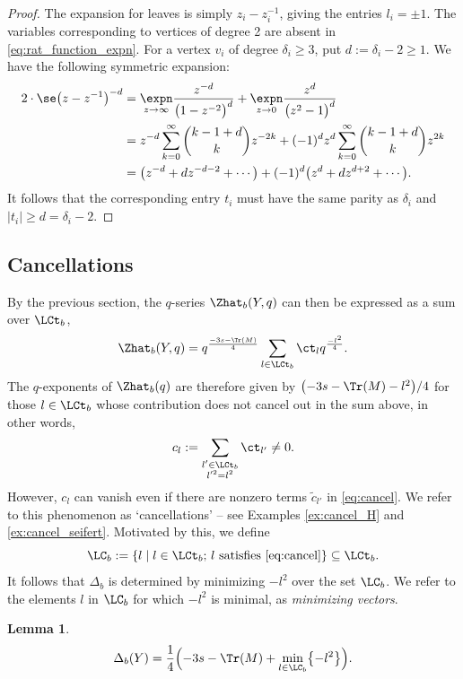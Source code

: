 \documentclass[pdftex]{sigma}
\newtheorem{Lemma}[Theorem]{Lemma}
\begin{document}
\begin{proof}
 The expansion for leaves is simply $z_i-z_i^{-1}$, giving the entries $l_i = \pm 1$. The variables corresponding to vertices of degree 2 are absent in \eqref{eq:rat_function_expn}. For a vertex $v_i$ of degree $\delta_{i} \geq 3$, put $d := \delta_{i}-2 \geq 1$. We have the following symmetric expansion:
 \begin{align*}
 2 \cdot \se \bigl(z-z^{-1}\bigr)^{-d} &{}=
 \underset{z \to \infty}{\expn} \frac{z^{-d}}{\bigl(1-z^{-2}\bigr)^{d}}
 + \underset{z \to 0}{\expn} \frac{z^{d}}{\bigl(z^2-1\bigr)^{d}}\\
 &{}=
 z^{-d} \sum_{k=0}^\infty \binom{k-1+d}{k}z^{-2k} + (-1)^d z^{d} \sum_{k=0}^\infty \binom{k-1+d}{k} z^{2k}\\
 &{}=
 \bigl(z^{-d} + d z^{-d-2} + \cdots\bigr) + (-1)^{d} \bigl(z^{d} + d z^{d+2} +\cdots\bigr).
 \end{align*}
 It follows that the corresponding entry $t_i$ must have the same parity as $\delta_i$ and $\lvert t_i \rvert \geq d = \delta_i-2$.
\end{proof}

\subsection{Cancellations}\label{ss:cancel}

By the previous section, the $q$-series $\Zhat_b(Y,q)$ can then be expressed as a sum over $\LCt_b$,
\begin{equation*}%
 \Zhat_b(Y,q) = q^{\frac{-3s - \Tr(M)}{4}} \sum_{l \in \LCt_b} \ct_l q^{\frac{-l^2}{4}}.
\end{equation*}
The $q$-exponents of $\Zhat_b(q)$ are therefore given by
$\bigl( -3s - \Tr(M) -l^2\bigr)/4$ for those $l \in \LCt_b$ whose contribution does not cancel out in the sum above, in other words,
\begin{equation}\label{eq:cancel}
 c_l:= \sum_{\substack{l' \in \LCt_b\\l'^2 = l^2}} \ct_{l'} \neq 0.
\end{equation}
However, $c_l$ can vanish even if there are nonzero terms $\tilde{c}_{l'}$ in \eqref{eq:cancel}. We refer to this phenomenon as `cancellations' -- see Examples \ref{ex:cancel_H} and \ref{ex:cancel_seifert}.
Motivated by this, we define
\[
 \LC_b := \{l \mid l \in \LCt_b;\, l \text{ satisfies \eqref{eq:cancel}} \} \subseteq \LCt_b.
\]
It follows that $\Delta_b$ is determined by minimizing $-l^2$ over the set $\LC_b$. We refer to the elements $l$ in $\LC_b$ for which $-l^2$ is minimal, as \emph{minimizing vectors}.
\begin{Lemma}\label{lm:delta_minimizer}
 \begin{equation*}
 \Delta_b(Y) = \frac14 \Bigl(-3s - \Tr(M) + \min_{l \in \LC_b} \bigl\{ -l^2 \bigr\}\Bigr).
 \end{equation*}
\end{Lemma}
\end{document}
